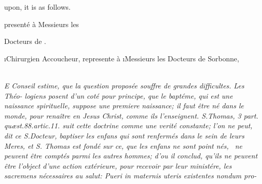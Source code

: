 \documentclass[twoside]{article}
\begin{document}
\medskip


\medskip

\bgroup\fontsize{8}{11}\selectfont
{}\break 
{}
upon, it is as follows.\par\egroup

\newpage
\centerline{\vrule width 0pt height 18pt presenté à Messieurs les}
\centerline{Docteurs de  \fnast.}

\vskip -2pt

\i{Chirurgien Accoucheur, represente à}\break
\i{Messieurs les Docteurs de} Sorbonne,\break
{}
\\[10pt]
\\[3pt]
\newpage
{}

\bgroup\fontsize{9.6}{14}\selectfont\itshape
E Conseil estime, que la question proposée\break 
souffre de grandes difficultes. Les Théo-\break
logiens  posent d’un coté pour principe, que\break
le baptéme, qui est une naissance spirituelle,\break
suppose une premiere naissance\textnormal{;} il faut être né\break
dans le monde, pour renaître en \textnormal{Jesus Christ},\break
comme ils l’enseignent. S.\@ \textnormal{Thomas, 3 part.\break
quæst.\@ 88.\@ artic.\@ 11.\@} suit cette doctrine\break 
comme une verité constante\textnormal{;} l’on ne peut,\break
dit ce S.\@ Docteur, baptiser les enfans qui sont\break
renfermés dans le sein de leurs Meres, et S.\break 
\textnormal{Thomas} est fondé sur ce, que les enfans ne\break 
sont point nés, \et\ ne peuvent être comptés\break
parmi les autres hommes\textnormal{;} d’ou il conclud,\break
qu’ils ne peuvent être l’object d’une action\break 
extérieure, pour recevoir par leur ministére, les\break
sacremens nécessaires au salut:  \textnormal{Pueri in\break
maternis uteris existentes nondum pro-}\break
{}
\egroup
\end{document}
